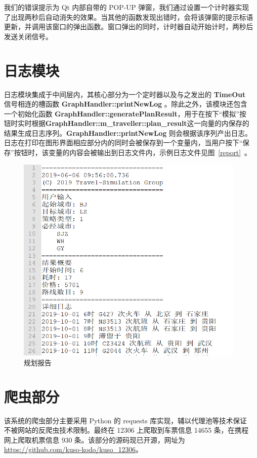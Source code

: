 \documentclass[lang=cn,blue,14pt]{elegantbook}
\begin{document}
我们的错误提示为 Qt 内部自带的 POP-UP 弹窗，我们通过设置一个计时器实现了出现两秒后自动消失的效果。当其他的函数发现出错时，会将该弹窗的提示标语更新，并调用该窗口的弹出函数。窗口弹出的同时，计时器自动开始计时，两秒后发送关闭信号。

\chapter{日志模块}
日志模块集成于中间层内，其核心部分为一个定时器以及与之发出的 \textbf{TimeOut} 信号相连的槽函数 \textbf{GraphHandler::printNewLog
}。除此之外，该模块还包含一个初始化函数 \textbf{GraphHandler::generatePlanResult}，用于在按下``模拟''按钮时实时根据\textbf{GraphHandler::m\_traveller::plan\_result}这一向量的内保存的结果生成日志序列。\textbf{GraphHandler::printNewLog} 则会根据该序列产出日志。日志在打印在图形界面相应部分内的同时会被保存到一个变量内，当用户按下``保存''按钮时，该变量的内容会被输出到日志文件内，示例日志文件见图~\ref{report}~。

\begin{figure}[!htbp]
	\centering
	\includegraphics[width=.9\textwidth]{report.png}
	\caption{规划报告}
	\label{result}
\end{figure}

\chapter{爬虫部分}
该系统的爬虫部分主要采用 Python 的 requests 库实现，辅以代理池等技术保证不被网站的反爬虫技术限制。最终在 12306 上爬取到车票信息 14655 条，在携程网上爬取机票信息 930 条。该部分的源码现已开源，网址为 \href{https://github.com/kuso-kodo/kuso\_12306}{https://github.com/kuso-kodo/kuso\_12306}。
\end{document}
